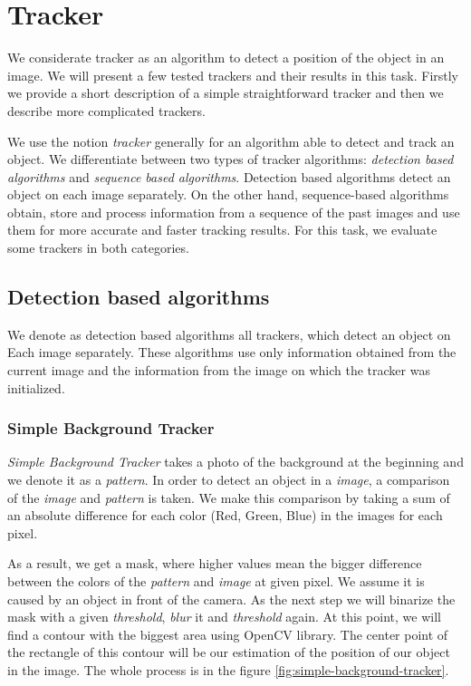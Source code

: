 \chapter{Tracker}

We considerate tracker as an algorithm to detect a position of the object in
an image. We will present a few tested trackers and their results in this task.
Firstly we provide a short description of a simple straightforward tracker and
then we describe more complicated trackers.

We use the notion \emph{tracker} generally for an algorithm able to detect and
track an object.  We differentiate between two types of tracker algorithms:
\emph{detection based algorithms} and \emph{sequence based algorithms}.
Detection based algorithms detect an object on each image separately. On the
other hand, sequence-based algorithms obtain, store and process information
from a sequence of the past images and use them for more accurate and faster
tracking results. For this task, we evaluate some trackers in both categories.

\section {Detection based algorithms}
We denote as detection based algorithms all trackers, which detect an object on
Each image separately. These algorithms use only information obtained from
the current image and the information from the image on which the tracker was
initialized.

\subsection{Simple Background Tracker}

\emph{Simple Background Tracker} takes a photo of the background at the
beginning and we denote it as a \emph{pattern}. In order to detect an object in
a \emph{image}, a comparison of the \emph{image} and \emph{pattern} is taken.
We make this comparison by taking a sum of an absolute difference for each
color (Red, Green, Blue) in the images for each pixel.

As a result, we get a mask, where higher values mean the bigger difference between
the colors of the \emph{pattern} and \emph{image} at given pixel. We assume it
is caused by an object in front of the camera.  As the next step we will
binarize the mask with a given \emph{threshold}, \emph{blur} it and
\emph{threshold} again. At this point, we will find a contour with the biggest
area using OpenCV library. The center point of the rectangle of this contour
will be our estimation of the position of our object in the image. The whole
process is in the figure \ref{fig:simple-background-tracker}.

